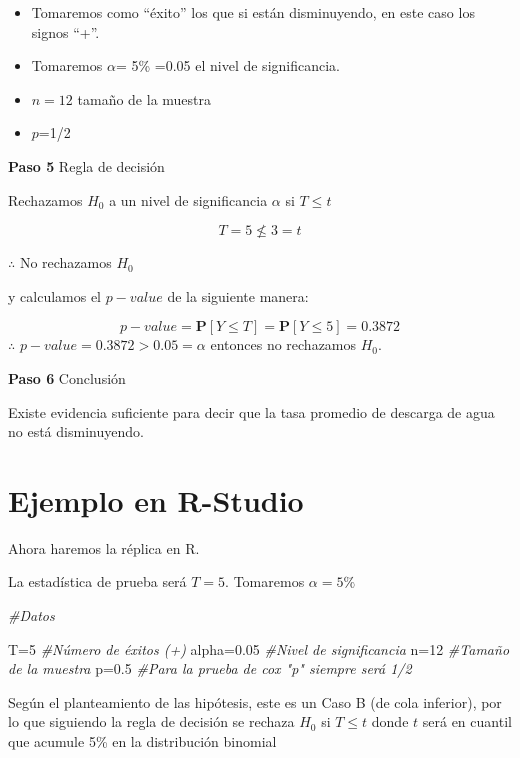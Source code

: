 \documentclass[
  a4paper,
  oneside,
  openany]{book}
\newenvironment{Shaded}{\begin{snugshade}}{\end{snugshade}}
\newcommand{\CommentTok}[1]{\textcolor[rgb]{0.56,0.35,0.01}{\textit{#1}}}
\newcommand{\DecValTok}[1]{\textcolor[rgb]{0.00,0.00,0.81}{#1}}
\newcommand{\FloatTok}[1]{\textcolor[rgb]{0.00,0.00,0.81}{#1}}
\newcommand{\NormalTok}[1]{#1}
\begin{document}
\begin{itemize}
\item
  Tomaremos como ``éxito'' los que si están disminuyendo, en este caso los signos ``+''.
\item
  Tomaremos \(\alpha\)= 5\% =0.05 el nivel de significancia.
\item
  \(n=12\) tamaño de la muestra
\item
  \(p\)=1/2
\end{itemize}

\textbf{Paso 5} Regla de decisión

Rechazamos \(H_0\) a un nivel de significancia \(\alpha\) si \(T \leq t\)

\[T=5 \nleq 3=t\]

\(\therefore\) No rechazamos \(H_0\)

y calculamos el \(p-value\) de la siguiente manera:

\[p-value=\mathbf{P}[Y\leq T]=\mathbf{P}[Y\leq 5]=0.3872\]
\(\therefore\) \(p-value=0.3872>0.05=\alpha\) entonces no rechazamos \(H_0\).

\textbf{Paso 6} Conclusión

Existe evidencia suficiente para decir que la tasa promedio de descarga de agua no está disminuyendo.

\hypertarget{ejemplo-en-r-studio-4}{%
\section{Ejemplo en R-Studio}\label{ejemplo-en-r-studio-4}}

Ahora haremos la réplica en R.

La estadística de prueba será \(T=5\). Tomaremos \(\alpha=5\%\)

\begin{Shaded}
\begin{Highlighting}[]
\CommentTok{\#Datos}

\NormalTok{T=}\DecValTok{5}              \CommentTok{\#Número de éxitos (+)}
\NormalTok{alpha=}\FloatTok{0.05}       \CommentTok{\#Nivel de significancia}
\NormalTok{n=}\DecValTok{12}              \CommentTok{\#Tamaño de la muestra }
\NormalTok{p=}\FloatTok{0.5}            \CommentTok{\#Para la prueba de cox "p" siempre será 1/2}
\end{Highlighting}
\end{Shaded}

Según el planteamiento de las hipótesis, este es un Caso B (de cola inferior), por lo que siguiendo la regla de decisión se rechaza \(H_0\) si \(T\leq t\) donde \(t\) será en cuantil que acumule 5\% en la distribución binomial
\end{document}
